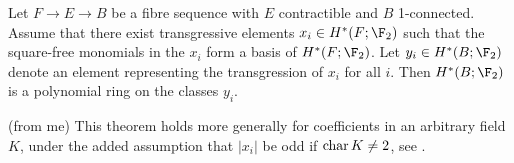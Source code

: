 \begin{theorem}\label{thm:borel}
	Let $F \to E \to B$ be a fibre sequence with $E$ contractible and $B$ 1-connected.
	Assume that there exist transgressive elements $x_i \in H^*(F; \F_2)$ such that the square-free monomials in the $x_i$ form a basis of $H^*(F; \F_2)$.
	Let $y_i \in H^*(B; \F_2)$ denote an element representing the transgression of $x_i$ for all $i$.
	Then $H^*(B; \F_2)$ is a polynomial ring on the classes $y_i$.
\end{theorem}
\begin{remark}
	(from me) This theorem holds more generally for coefficients in an arbitrary field $K$, under the added assumption that $|x_i|$ be odd if $\operatorname{char} K \neq 2$, see \cite[Theorem 5.34]{hatcher_chapter_nodate}.
\end{remark}
